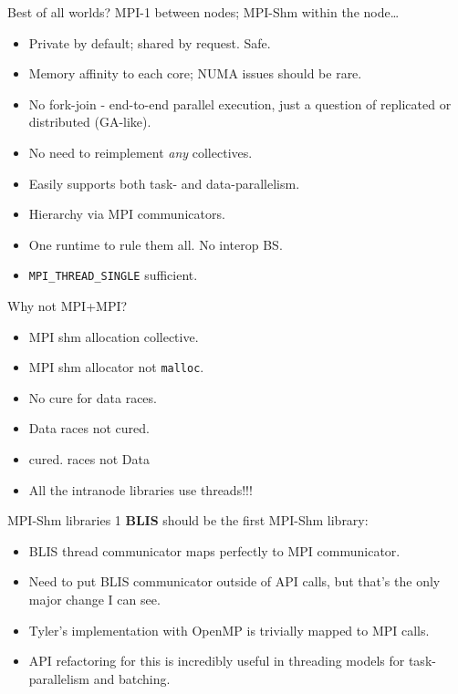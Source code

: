 \documentclass[11pt]{beamer}
\begin{document}
\begin{frame}{Best of all worlds?}
    MPI-1 between nodes; MPI-Shm within the node\ldots
    \begin{itemize}
        \item Private by default; shared by request.  Safe.
        \item Memory affinity to each core; NUMA issues should be rare.
        \item No fork-join - end-to-end parallel execution, 
              just a question of replicated or distributed (GA-like).
        \item No need to reimplement \textit{any} collectives.
        \item Easily supports both task- and data-parallelism.
        \item Hierarchy via MPI communicators.
        \item One runtime to rule them all.  No interop BS.
        \item \texttt{MPI\_THREAD\_SINGLE} sufficient.
    \end{itemize}
\end{frame}

\begin{frame}{Why not MPI+MPI?} \Large
    \begin{itemize}
        \item MPI shm allocation collective.
        \item MPI shm allocator not \texttt{malloc}.
        \item No cure for data races.
        \item Data races not cured.
        \item cured. races not Data
        \item All the intranode libraries use threads!!!
    \end{itemize}
\end{frame}

\begin{frame}{MPI-Shm libraries 1} \large
    \textbf{BLIS} should be the first MPI-Shm library:
    \begin{itemize}
        \item BLIS thread communicator maps perfectly to MPI communicator.
        \item Need to put BLIS communicator outside of API calls,
              but that's the only major change I can see.
        \item Tyler's implementation with OpenMP is trivially mapped
              to MPI calls.
        \item API refactoring for this is incredibly useful in threading
              models for task-parallelism and batching.
    \end{itemize}
\end{frame}
\end{document}
